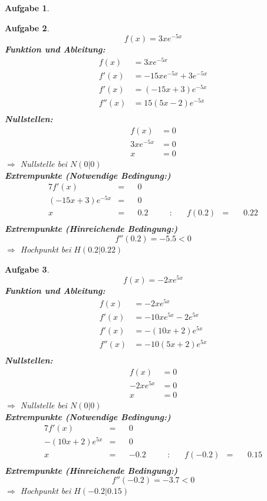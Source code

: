 \documentclass[12pt]{article}
\theoremstyle{note}
\newtheorem{aufgabe}{Aufgabe}
\begin{document}
\begin{flushleft}
\begin{aufgabe}
\end{aufgabe}\clearpage\begin{aufgabe} ~  
$$f(x)=3 x e^{- 5 x}$$ 
{\bf Funktion und Ableitung:} 
\begin{align*} 
f(x)&=3 x e^{- 5 x}\\ 
f'(x)&=- 15 x e^{- 5 x} + 3 e^{- 5 x}\\ 
f'(x)&=\left(- 15 x + 3\right) e^{- 5 x}\\ 
f''(x)&=15 \left(5 x - 2\right) e^{- 5 x}\\ 
\end{align*} 
{\bf Nullstellen:} 
\begin{align*} 
f(x)&=0 \\ 
3 x e^{- 5 x}&=0 \\ 
x&=0\end{align*} 
$\Rightarrow$ Nullstelle bei $N(0|0)$ \\ 
{\bf Extrempunkte (Notwendige Bedingung:)} 
\begin{alignat*}{7} 
f'(x)&=& &0& \\ 
\left(- 15 x + 3\right) e^{- 5 x}&=& &0& \\ 
x&=& &0.2& \quad &:& \quad f(0.2)&=& \, &0.22\\ 
\end{alignat*} 
{\bf Extrempunkte (Hinreichende Bedingung:)} 
\\ 
$$f''(0.2)=-5.5< 0 $$ 
$\Rightarrow$ Hochpunkt bei $H(0.2|0.22)$ \\ 

\end{aufgabe}\clearpage\begin{aufgabe} ~  
$$f(x)=- 2 x e^{5 x}$$ 
{\bf Funktion und Ableitung:} 
\begin{align*} 
f(x)&=- 2 x e^{5 x}\\ 
f'(x)&=- 10 x e^{5 x} - 2 e^{5 x}\\ 
f'(x)&=- \left(10 x + 2\right) e^{5 x}\\ 
f''(x)&=- 10 \left(5 x + 2\right) e^{5 x}\\ 
\end{align*} 
{\bf Nullstellen:} 
\begin{align*} 
f(x)&=0 \\ 
- 2 x e^{5 x}&=0 \\ 
x&=0\end{align*} 
$\Rightarrow$ Nullstelle bei $N(0|0)$ \\ 
{\bf Extrempunkte (Notwendige Bedingung:)} 
\begin{alignat*}{7} 
f'(x)&=& &0& \\ 
- \left(10 x + 2\right) e^{5 x}&=& &0& \\ 
x&=& &-0.2& \quad &:& \quad f(-0.2)&=& \, &0.15\\ 
\end{alignat*} 
{\bf Extrempunkte (Hinreichende Bedingung:)} 
\\ 
$$f''(-0.2)=-3.7< 0 $$ 
$\Rightarrow$ Hochpunkt bei $H(-0.2|0.15)$ \\ 


\end{aufgabe}
\end{flushleft}
\end{document}

